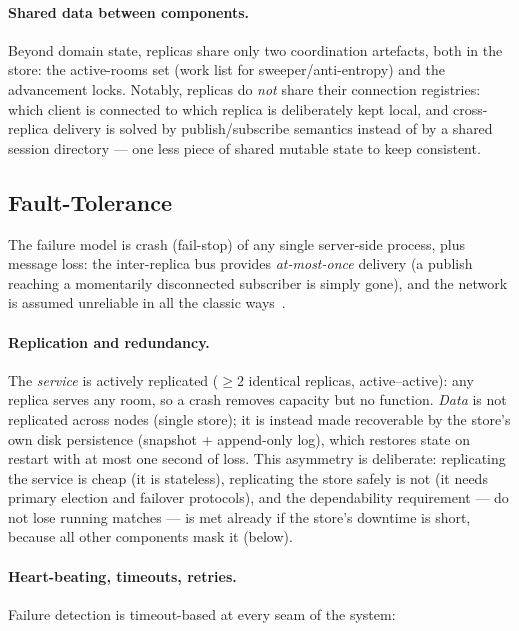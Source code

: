 \documentclass{scrartcl}
\begin{document}
\paragraph{Shared data between components.}
Beyond domain state, replicas share only two coordination artefacts, both
in the store: the active-rooms set (work list for sweeper/anti-entropy)
and the advancement locks. Notably, replicas do \emph{not} share their
connection registries: which client is connected to which replica is
deliberately kept local, and cross-replica delivery is solved by
publish/subscribe semantics instead of by a shared session directory ---
one less piece of shared mutable state to keep consistent.

\subsection{Fault-Tolerance}\label{fault-tolerance}

The failure model is crash (fail-stop) of any single server-side process,
plus message loss: the inter-replica bus provides \emph{at-most-once}
delivery (a publish reaching a momentarily disconnected subscriber is
simply gone), and the network is assumed unreliable in all the classic
ways~\cite{rotem2006fallacies}.

\paragraph{Replication and redundancy.}
The \emph{service} is actively replicated ($\geq 2$ identical replicas,
active--active): any replica serves any room, so a crash removes capacity
but no function. \emph{Data} is not replicated across nodes (single
store); it is instead made recoverable by the store's own disk persistence
(snapshot + append-only log), which restores state on restart with at most
one second of loss. This asymmetry is deliberate: replicating the service
is cheap (it is stateless), replicating the store safely is not (it needs
primary election and failover protocols), and the dependability
requirement --- do not lose running matches --- is met already if the store's
downtime is short, because all other components mask it (below).

\paragraph{Heart-beating, timeouts, retries.}
Failure detection is timeout-based at every seam of the system:
\end{document}
